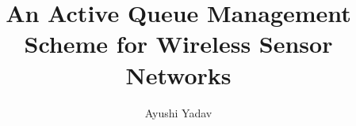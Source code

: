 \documentclass[defaultstyle,11pt]{thesis}
\title{An Active Queue Management Scheme for Wireless Sensor Networks}
\author{Ayushi Yadav}
\begin{document}








\nocite{*}		%
\appendix
\appendixpage


\end{document}

